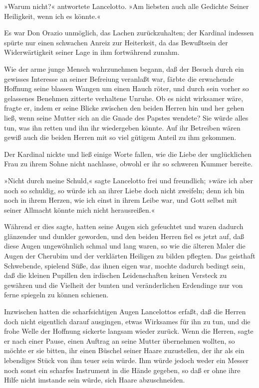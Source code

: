 »Warum nicht?« antwortete Lancelotto. »Am liebsten auch alle
Gedichte Seiner Heiligkeit, wenn ich es könnte.«

Es war Don Orazio unmöglich, das Lachen zurückzuhalten; der
Kardinal indessen spürte nur einen schwachen\pagenum{[60]} Anreiz
zur Heiterkeit, da das Bewußtsein der Widerwärtigkeit seiner Lage
in ihm fortwährend zunahm.

Wie der arme junge Mensch wahrzunehmen begann, daß der Besuch durch
ein gewisses Interesse an seiner Befreiung veranlaßt war, färbte
die erwachende Hoffnung seine blassen Wangen um einen Hauch röter,
und durch sein vorher so gelassenes Benehmen zitterte verhaltene
Unruhe. Ob es nicht wirksamer wäre, fragte er, indem er seine
Blicke zwischen den beiden Herren hin und her gehen ließ, wenn
seine Mutter sich an die Gnade des Papstes wendete? Sie würde alles
tun, was ihn retten und ihn ihr wiedergeben könnte. Auf ihr
Betreiben wären gewiß auch die beiden Herren mit so viel gütigem
Anteil zu ihm gekommen.

Der Kardinal nickte und ließ einige Worte fallen, wie die Liebe der
unglücklichen Frau zu ihrem Sohne nicht nachlasse, obwohl er ihr so
schweren Kummer bereite.

»Nicht durch meine Schuld,« sagte Lancelotto frei und freundlich;
»wäre ich aber noch so schuldig, so würde ich an ihrer Liebe doch
nicht zweifeln; denn ich bin noch in ihrem Herzen, wie ich einst in
ihrem Leibe war, und Gott selbst mit seiner Allmacht könnte mich
nicht herausreißen.«

Während er dies sagte, hatten seine Augen sich gefeuchtet und waren
dadurch glänzender und dunkler geworden, und den beiden Herren fiel
es jetzt auf, daß diese Augen ungewöhnlich schmal und lang waren,
so wie die älteren Maler die Augen der Cherubim und der verklärten
Heiligen zu bilden pflegten. Das geisthaft Schwebende, spielend
Süße, das ihnen eigen war, mochte dadurch bedingt sein, daß die
kleinen Pupillen den irdischen Leidenschaften keinen Versteck zu
gewähren und die Vielheit der bunten und veränderlichen Erdendinge
nur von ferne spiegeln zu können schienen.

\pagenum{[61]}Inzwischen hatten die scharfsichtigen Augen
Lancelottos erfaßt, daß die Herren doch nicht eigentlich darauf
ausgingen, etwas Wirksames für ihn zu tun, und die frohe Welle der
Hoffnung sickerte langsam wieder zurück. Wenn die Herren, sagte er
nach einer Pause, einen Auftrag an seine Mutter übernehmen wollten,
so möchte er sie bitten, ihr einen Büschel seiner Haare
zuzustellen, der ihr als ein lebendiges Stück von ihm teuer sein
würde. Ihm würde jedoch weder ein Messer noch sonst ein scharfes
Instrument in die Hände gegeben, so daß er ohne ihre Hilfe nicht
imstande sein würde, sich Haare abzuschneiden.

